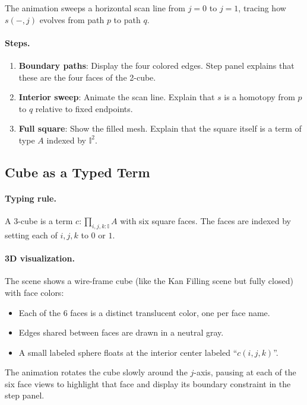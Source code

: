 \documentclass[11pt,a4paper]{article}
\begin{document}
\noindent The animation sweeps a horizontal scan line from $j=0$ to $j=1$,
tracing how $s(-,j)$ evolves from path $p$ to path $q$.

\paragraph{Steps.}
\begin{enumerate}
  \item \textbf{Boundary paths}: Display the four colored edges. Step panel
    explains that these are the four faces of the 2-cube.
  \item \textbf{Interior sweep}: Animate the scan line. Explain that $s$ is a
    homotopy from $p$ to $q$ relative to fixed endpoints.
  \item \textbf{Full square}: Show the filled mesh. Explain that the square
    itself is a term of type $A$ indexed by $\mathbb{I}^2$.
\end{enumerate}

\subsection{Cube as a Typed Term}

\paragraph{Typing rule.}
A 3-cube is a term $c : \prod_{i,j,k:\mathbb{I}} A$ with six square faces.
The faces are indexed by setting each of $i,j,k$ to $0$ or $1$.

\paragraph{3D visualization.}
The scene shows a wire-frame cube (like the Kan Filling scene but fully closed)
with face colors:
\begin{itemize}
  \item Each of the 6 faces is a distinct translucent color, one per face name.
  \item Edges shared between faces are drawn in a neutral gray.
  \item A small labeled sphere floats at the interior center labeled ``$c(i,j,k)$''.
\end{itemize}

\noindent The animation rotates the cube slowly around the $j$-axis, pausing at
each of the six face views to highlight that face and display its boundary
constraint in the step panel.
\end{document}
